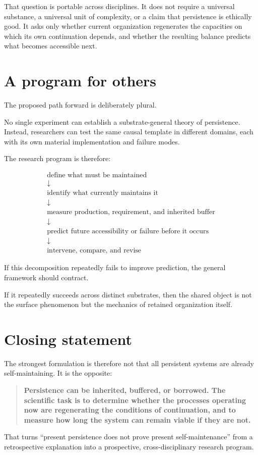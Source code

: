 \documentclass[11pt,a4paper]{article}
\begin{document}
That question is portable across disciplines. It does not require a universal substance, a universal unit of complexity, or a claim that persistence is ethically good. It asks only whether current organization regenerates the capacities on which its own continuation depends, and whether the resulting balance predicts what becomes accessible next.

\section{A program for others}

The proposed path forward is deliberately plural.

No single experiment can establish a substrate-general theory of persistence. Instead, researchers can test the same causal template in different domains, each with its own material implementation and failure modes.

The research program is therefore:

\begin{equation}
\boxed{
\begin{gathered}
\text{define what must be maintained}\\
\downarrow\\
\text{identify what currently maintains it}\\
\downarrow\\
\text{measure production, requirement, and inherited buffer}\\
\downarrow\\
\text{predict future accessibility or failure before it occurs}\\
\downarrow\\
\text{intervene, compare, and revise}
\end{gathered}
}
\end{equation}

If this decomposition repeatedly fails to improve prediction, the general framework should contract.

If it repeatedly succeeds across distinct substrates, then the shared object is not the surface phenomenon but the mechanics of retained organization itself.

\section*{Closing statement}

The strongest formulation is therefore not that all persistent systems are already self-maintaining. It is the opposite:

\begin{quote}
\textbf{Persistence can be inherited, buffered, or borrowed. The scientific task is to determine whether the processes operating now are regenerating the conditions of continuation, and to measure how long the system can remain viable if they are not.}
\end{quote}

That turns ``present persistence does not prove present self-maintenance'' from a retrospective explanation into a prospective, cross-disciplinary research program.
\end{document}
